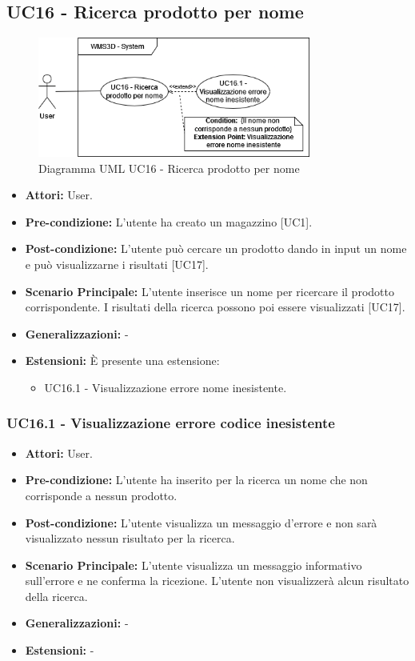 \subsection{UC16 - Ricerca prodotto per nome}
\begin{figure}[H]
  \centering
  \includegraphics[width=0.8\textwidth]{UC_diagrams_11-20/UC16.drawio.png}
   \caption{Diagramma UML UC16 - Ricerca prodotto per nome}
\end{figure}
\begin{itemize}
    \item \textbf{Attori:} User.
    \item \textbf{Pre-condizione:} L'utente ha creato un magazzino [UC1].
    \item \textbf{Post-condizione:} L'utente può cercare un prodotto dando in input un nome e può visualizzarne i risultati [UC17].
    \item \textbf{Scenario Principale:} L'utente inserisce un nome per ricercare il prodotto corrispondente. I risultati della ricerca possono poi essere visualizzati [UC17].
    \item \textbf{Generalizzazioni:} -
    \item \textbf{Estensioni:} È presente una estensione:
    \begin{itemize}
        \item UC16.1 - Visualizzazione errore nome inesistente.
    \end{itemize}
\end{itemize}


\subsubsection{UC16.1 - Visualizzazione errore codice inesistente}
\begin{itemize}
    \item \textbf{Attori:} User.
    \item \textbf{Pre-condizione:}  L'utente ha inserito per la ricerca un nome che non corrisponde a nessun prodotto.
    \item \textbf{Post-condizione:}  L'utente visualizza un messaggio d'errore e non sarà visualizzato nessun risultato per la ricerca.
    \item \textbf{Scenario Principale:}  L'utente visualizza un messaggio informativo sull'errore e ne conferma la ricezione. L'utente non visualizzerà alcun risultato della ricerca.
    \item \textbf{Generalizzazioni:} -
    \item \textbf{Estensioni:} -
\end{itemize}